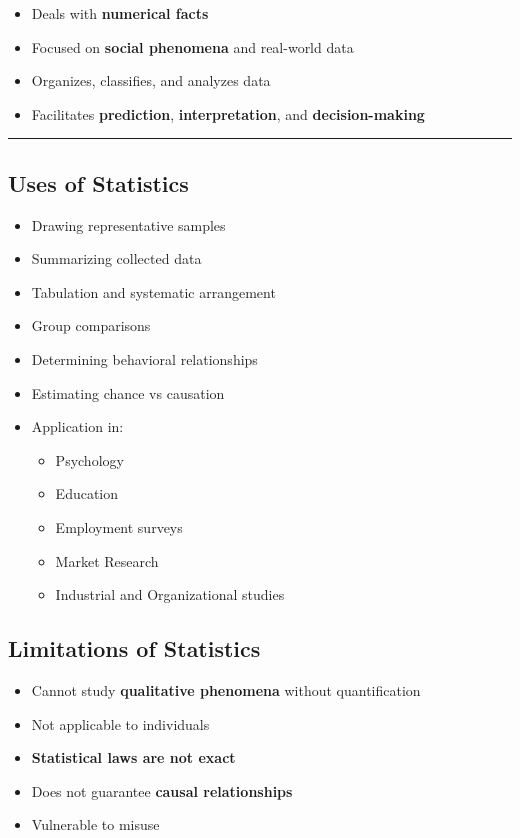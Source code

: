 \documentclass[
  letterpaper,
  DIV=11,
  numbers=noendperiod]{scrreprt}
\providecommand{\tightlist}{%
  \setlength{\itemsep}{0pt}\setlength{\parskip}{0pt}}
\begin{document}
\begin{itemize}
\tightlist
\item
  Deals with \textbf{numerical facts}
\item
  Focused on \textbf{social phenomena} and real-world data
\item
  Organizes, classifies, and analyzes data
\item
  Facilitates \textbf{prediction}, \textbf{interpretation}, and
  \textbf{decision-making}
\end{itemize}

\begin{center}\rule{0.5\linewidth}{0.5pt}\end{center}

\subsection{Uses of Statistics}\label{uses-of-statistics}

\begin{itemize}
\tightlist
\item
  Drawing representative samples
\item
  Summarizing collected data
\item
  Tabulation and systematic arrangement
\item
  Group comparisons
\item
  Determining behavioral relationships
\item
  Estimating chance vs causation
\item
  Application in:

  \begin{itemize}
  \tightlist
  \item
    Psychology
  \item
    Education
  \item
    Employment surveys
  \item
    Market Research
  \item
    Industrial and Organizational studies
  \end{itemize}
\end{itemize}

\subsection{Limitations of Statistics}\label{limitations-of-statistics}

\begin{itemize}
\tightlist
\item
  Cannot study \textbf{qualitative phenomena} without quantification
\item
  Not applicable to individuals
\item
  \textbf{Statistical laws are not exact}
\item
  Does not guarantee \textbf{causal relationships}
\item
  Vulnerable to misuse
\end{itemize}
\end{document}
